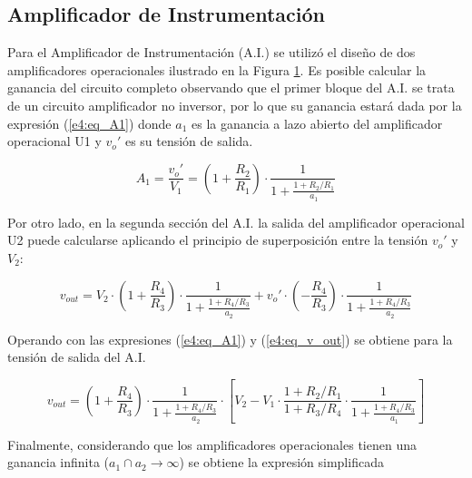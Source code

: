 \subsection{Amplificador de Instrumentación}
Para el Amplificador de Instrumentación (A.I.) se utilizó el diseño de dos amplificadores operacionales ilustrado en la Figura \ref{e4:fig_amp_inst}.
Es posible calcular la ganancia del circuito completo observando que el primer bloque del A.I. se trata de un circuito amplificador no inversor, por lo que su ganancia estará dada por la expresión (\ref{e4:eq_A1}) donde $a_1$ es la ganancia a lazo abierto del amplificador operacional U1 y $v_o'$ es su tensión de salida.

\begin{figure}[ht]
\begin{center}

\label{e4:fig_amp_inst}
\end{center}
\end{figure}

\begin{equation}
A_1 = \frac{v_o'}{V_1} = \left(1+ \frac{R_2}{R_1}\right) \cdot \frac{1}{1 + \frac{1+R_2/R_1}{a_1}}
\label{e4:eq_A1}
\end{equation}

Por otro lado, en la segunda sección del A.I. la salida del amplificador operacional U2 puede calcularse aplicando el principio de superposición entre la tensión $v_o'$ y $V_2$:

\begin{equation}
v_{out} = V_2 \cdot \left(1 + \frac{R_4}{R_3}\right) \cdot \frac{1}{1 + \frac{1+R_4/R_3}{a_2}} + v_o' \cdot \left(- \frac{R_4}{R_3}\right) \cdot \frac{1}{1 + \frac{1+R_4/R_3}{a_2}}
\label{e4:eq_v_out}
\end{equation}

Operando con las expresiones (\ref{e4:eq_A1}) y (\ref{e4:eq_v_out}) se obtiene para la tensión de salida del A.I.

\begin{equation}
v_{out} = \left(1 + \frac{R_4}{R_3}\right) \cdot \frac{1}{1 + \frac{1+R_4/R_3}{a_2}} \cdot \left[ V_2 - V_1 \cdot \frac{1+ R_2/R_1}{1+R_3/R_4} \cdot \frac{1}{1 + \frac{1+R_4/R_3}{a_1}} \right]
\label{e4:eq_v_out_a_fin}
\end{equation}

Finalmente, considerando que los amplificadores operacionales tienen una ganancia infinita ($a_1 \cap a_2 \rightarrow \infty$) se obtiene la expresión simplificada 

